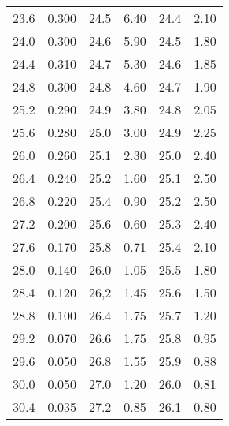 \begin{longtable}{S[table-format=3.2] S[table-format=3.2] S[table-format=3.2] S[table-format=3.2] S[table-format=3.2] S[table-format=3.2]}
          23.6   &   0.300  &     24.5    &  6.40   & 24.4   &   2.10                                      \\
          24.0   &   0.300  &     24.6    &  5.90   & 24.5   &   1.80                                      \\
          24.4   &   0.310  &     24.7    &  5.30   & 24.6   &   1.85                                      \\
          24.8   &   0.300  &     24.8    &  4.60   & 24.7   &   1.90                                      \\
          25.2   &   0.290  &     24.9    &  3.80   & 24.8   &   2.05                                      \\
          25.6   &   0.280  &     25.0    &  3.00   & 24.9   &   2.25                                      \\
          26.0   &   0.260  &     25.1    &  2.30   & 25.0   &   2.40                                      \\
          26.4   &   0.240  &     25.2    &  1.60   & 25.1   &   2.50                                      \\
          26.8   &   0.220  &     25.4    &  0.90   & 25.2   &   2.50                                      \\
          27.2   &   0.200  &     25.6    &  0.60   & 25.3   &   2.40                                      \\
          27.6   &   0.170  &     25.8    &  0.71   & 25.4   &   2.10                                      \\
          28.0   &   0.140  &     26.0    &  1.05   & 25.5   &   1.80                                      \\
          28.4   &   0.120  &     26,2    &  1.45   & 25.6   &   1.50                                      \\
          28.8   &   0.100  &     26.4    &  1.75   & 25.7   &   1.20                                      \\
          29.2   &   0.070  &     26.6    &  1.75   & 25.8   &   0.95                                      \\
          29.6   &   0.050  &     26.8    &  1.55   & 25.9   &   0.88                                      \\
          30.0   &   0.050  &     27.0    &  1.20   & 26.0   &   0.81                                      \\
          30.4   &   0.035  &     27.2    &  0.85   & 26.1   &   0.80                                      \\

\end{longtable}
